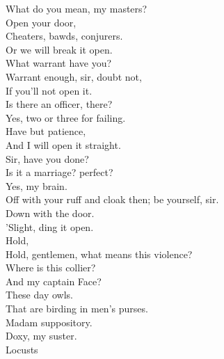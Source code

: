\documentclass{memoir}
\begin{document}
\begin{drama*}
\lovewitspeaks  What do you mean, my masters?\\
\mammonspeaks {} Open your door,\\
 Cheaters, bawds, conjurers.\\
\officeronespeaks {} Or we will break it open.\\
\lovewitspeaks {} What warrant have you?\\
\officeronespeaks {} Warrant enough, sir, doubt not,\\
 If you'll not open it.\\
\lovewitspeaks {} Is there an officer, there?\\
\officeronespeaks {} Yes, two or three for failing.\\
\lovewitspeaks  Have but patience,\\
 And I will open it straight.\\
\facespeaks {} Sir, have you done?\\
 Is it a marriage? perfect?\\
\lovewitspeaks {} Yes, my brain.\\
\facespeaks  Off with your ruff and cloak then; be yourself, sir.\\
\surlyspeaks {} Down with the door.\\
\kastrilspeaks {} 'Slight, ding it open.\\
\lovewitspeaks {} Hold,\\
 Hold, gentlemen, what means this violence?\\
\mammonspeaks  Where is this collier?\\
\surlyspeaks {} And my captain Face?\\
\mammonspeaks  These day owls.\\
\surlyspeaks {} That are birding in men's purses.\\
\mammonspeaks  Madam suppository.\\
\kastrilspeaks {} Doxy, my suster.\\
\ananiasspeaks  Locusts\\

\end{drama*}
\end{document}
